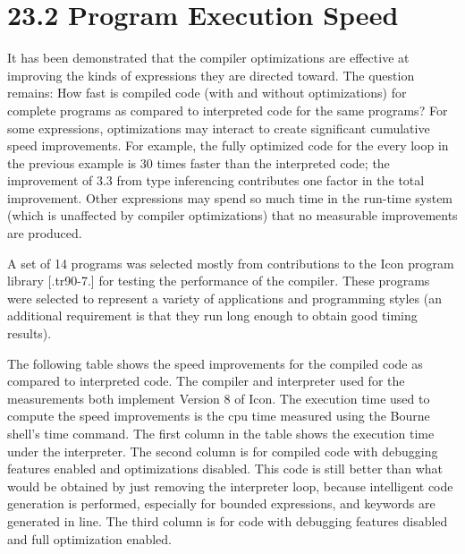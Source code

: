 \section[23.2 Program Execution Speed]{23.2 Program Execution Speed}

It has been demonstrated that the compiler optimizations are effective
at improving the kinds of expressions they are directed toward. The
question remains: How fast is compiled code (with and without
optimizations) for complete programs as compared to interpreted code
for the same programs? For some expressions, optimizations may
interact to create significant cumulative speed improvements. For
example, the fully optimized code for the every loop in the previous
example is 30 times faster than the interpreted code; the improvement
of 3.3 from type inferencing contributes one factor in the total
improvement. Other expressions may spend so much time in the run-time
system (which is unaffected by compiler optimizations) that no
measurable improvements are produced.

A set of 14 programs was selected mostly from contributions to the
Icon program library [.tr90-7.] for testing the performance of the
compiler. These programs were selected to represent a variety of
applications and programming styles (an additional requirement is that
they run long enough to obtain good timing results).

The following table shows the speed improvements for the compiled code
as compared to interpreted code. The compiler and interpreter used for
the measurements both implement Version 8 of Icon. The execution time
used to compute the speed improvements is the cpu time measured using
the Bourne shell's time command. The first column in the table shows
the execution time under the interpreter. The second column is for
compiled code with debugging features enabled and optimizations
disabled. This code is still better than what would be obtained by
just removing the interpreter loop, because intelligent code
generation is performed, especially for bounded expressions, and
keywords are generated in line. The third column is for code with
debugging features disabled and full optimization enabled.

